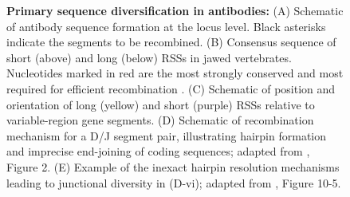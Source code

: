 \begin{figure}
\caption[Primary sequence diversification in antibodies]{\textbf{Primary sequence diversification in antibodies:} (A) Schematic of antibody sequence formation at the locus level. Black asterisks indicate the segments to be recombined. (B) Consensus sequence of short (above) and long (below) RSSs in jawed vertebrates. Nucleotides marked in red are the most strongly conserved and most required for efficient recombination \parencite{hesse1989rss}. (C) Schematic of position and orientation of long (yellow) and short (purple) RSSs relative to variable-region gene segments. (D) Schematic of recombination mechanism for a D/J segment pair, illustrating hairpin formation and imprecise end-joining of coding sequences; adapted from \parencite{schatz2011vdjr}, Figure 2. (E) Example of the inexact hairpin resolution mechanisms leading to junctional diversity in (D-vi); adapted from \parencite{flaherty2012chapter}, Figure 10-5.
} 
\label{fig:intro-vdjr}
\end{figure}


%

